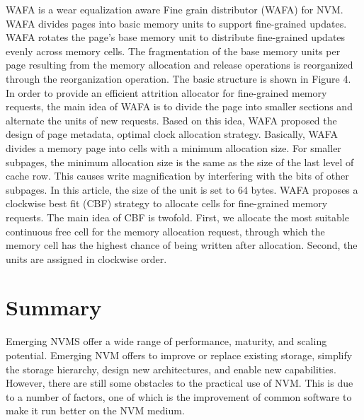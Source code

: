 \documentclass[sigconf]{acmart}
\begin{document}
WAFA is a wear equalization aware Fine grain distributor (WAFA) for NVM. WAFA divides pages into basic memory units to support fine-grained updates. WAFA rotates the page's base memory unit to distribute fine-grained updates evenly across memory cells. The fragmentation of the base memory units per page resulting from the memory allocation and release operations is reorganized through the reorganization operation. The basic structure is shown in Figure 4. In order to provide an efficient attrition allocator for fine-grained memory requests, the main idea of WAFA is to divide the page into smaller sections and alternate the units of new requests. Based on this idea, WAFA proposed the design of page metadata, optimal clock allocation strategy. Basically, WAFA divides a memory page into cells with a minimum allocation size. For smaller subpages, the minimum allocation size is the same as the size of the last level of cache row. This causes write magnification by interfering with the bits of other subpages. In this article, the size of the unit is set to 64 bytes. WAFA proposes a clockwise best fit (CBF) strategy to allocate cells for fine-grained memory requests. The main idea of CBF is twofold. First, we allocate the most suitable continuous free cell for the memory allocation request, through which the memory cell has the highest chance of being written after allocation. Second, the units are assigned in clockwise order.

\section{Summary}

Emerging NVMS offer a wide range of performance, maturity, and scaling potential. Emerging NVM offers to improve or replace existing storage, simplify the storage hierarchy, design new architectures, and enable new capabilities. However, there are still some obstacles to the practical use of NVM. This is due to a number of factors, one of which is the improvement of common software to make it run better on the NVM medium.
	




\end{document}
